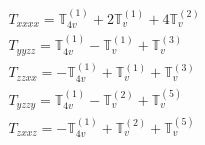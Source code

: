 \documentclass[fleqn,8pt,landscape]{jsarticle}
\begin{document}
\begin{align*}
& T_{xxxx} = \mathbb{T}_{4v}^{(1)} + 2 \mathbb{T}_{v}^{(1)} + 4 \mathbb{T}_{v}^{(2)} \\
& T_{yyzz} = \mathbb{T}_{4v}^{(1)} - \mathbb{T}_{v}^{(1)} + \mathbb{T}_{v}^{(3)} \\
& T_{zzxx} = - \mathbb{T}_{4v}^{(1)} + \mathbb{T}_{v}^{(1)} + \mathbb{T}_{v}^{(3)} \\
& T_{yzzy} = \mathbb{T}_{4v}^{(1)} - \mathbb{T}_{v}^{(2)} + \mathbb{T}_{v}^{(5)} \\
& T_{zxxz} = - \mathbb{T}_{4v}^{(1)} + \mathbb{T}_{v}^{(2)} + \mathbb{T}_{v}^{(5)}
\end{align*}
\end{document}
